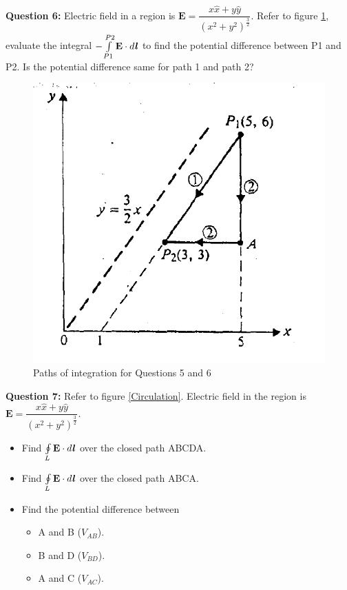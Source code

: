 \documentclass[12pt,a4paper]{article}
\begin{document}
\noindent\textbf{Question 6:} Electric field in a region is $\textbf{E}=\dfrac{x\hat x+y\hat y}{(x^2+y^2)^{\frac{3}{2}}}$. Refer to figure \ref{Cheng-integral}, evaluate the integral $-\int\limits_{P1}^{P2}\textbf{E}\cdot d\textbf{\textit{l}}$ to find the potential difference between P1 and P2. Is the potential difference same for path 1 and path 2?
\begin{figure}[H]
\centering
\includegraphics[scale=0.6]{Figure2-10Cheng.png}
\caption{Paths of integration for Questions 5 and 6 \cite[Figure 2--10, page 23]{Cheng}}
\label{Cheng-integral}
\end{figure}
\noindent\textbf{Question 7:} Refer to figure \ref{Circulation}. Electric field in the region is $\textbf{E}=\dfrac{x\hat x+y\hat y}{(x^2+y^2)^\frac{3}{2}}$.
\begin{itemize}
\item[(a)] Find $\oint\limits_L \textbf{E}\cdot d\textbf{\textit{l}}$ over the closed path ABCDA.
\item[(b)] Find $\oint\limits_L \textbf{E}\cdot d\textbf{\textit{l}}$ over the closed path ABCA.
\item[(c)] Find the potential difference between
\begin{itemize}
\item[(1)] A and B ($V_{AB}$).
\item[(2)] B and D ($V_{BD}$).
\item[(3)] A and C ($V_{AC}$).
\end{itemize}
\end{itemize}
\end{document}
